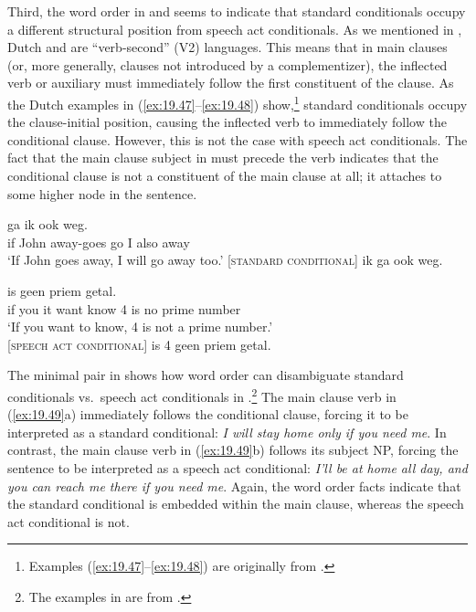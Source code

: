 Third, the word order in  and  seems to indicate that standard conditionals occupy a different structural position from speech act conditionals. As we mentioned in , Dutch and  are “verb-second” (V2) languages. This means that in main clauses (or, more generally, clauses not introduced by a complementizer), the inflected verb or auxiliary must immediately follow the first constituent of the clause. As the Dutch examples in (\ref{ex:19.47}--\ref{ex:19.48}) show,\footnote{Examples (\ref{ex:19.47}--\ref{ex:19.48}) are originally from \citet[ch. 2]{Iatridou1991}.} standard conditionals occupy the clause-initial position, causing the inflected verb to immediately follow the conditional clause. However, this is not the case with speech act conditionals. The fact that the main clause subject in  must precede the verb indicates that the conditional clause is not a constituent of the main clause at all; it attaches to some higher node in the sentence.


\ea \label{ex:19.47}
\ea  {}  ga  ik  ook  weg.\\
 if  John  away-goes  go  I  also  away\\
\glt ‘If John goes away, I will go away too.’ \hfill    [\textsc{standard conditional}]
 ik ga ook weg.
\z \z

\ea \label{ex:19.48}
\ea  {}  is  geen  priem  getal.\\
 if  you  it  want  know  4  is  no  prime  number\\
\glt ‘If you want to know, 4 is not a prime number.’ \\
\hfill [\textsc{speech act} \textsc{conditional}]
 is 4 geen priem getal.
\z \z


The minimal pair in  shows how word order can disambiguate standard conditionals vs.~speech act conditionals in .\footnote{The examples in  are from \citet[102]{Scheffler2013}.} The main clause verb in (\ref{ex:19.49}a) immediately follows the conditional clause, forcing it to be interpreted as a standard conditional: \textit{I will stay home only if you need me}. In contrast, the main clause verb in (\ref{ex:19.49}b) follows its subject NP, forcing the sentence to be interpreted as a speech act conditional: \textit{I’ll be at home all day, and you can reach me there if you need me}. Again, the word order facts indicate that the standard conditional is embedded within the main clause, whereas the speech act conditional is not.



